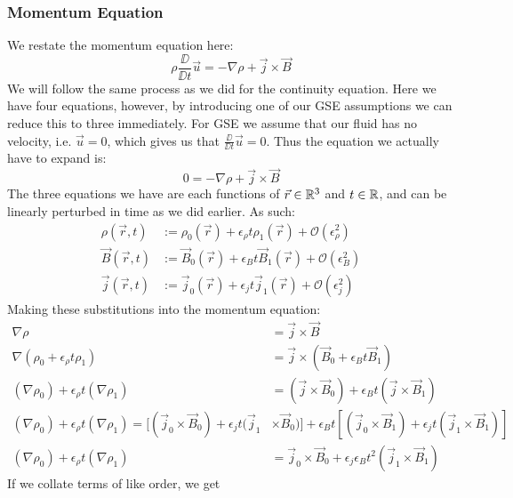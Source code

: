 \subsubsection{Momentum Equation}
We restate the momentum equation here:
\begin{equation*}
    \rho \frac{\DD}{\DD t}\vec{u} = -\nabla \rho + \vec{j} \times \vec{B}
\end{equation*}
We will follow the same process as we did for the continuity equation. Here we have four equations, however, by introducing one of 
our GSE assumptions we can reduce this to three immediately. For GSE we assume that our fluid has no velocity, i.e. $\vec{u} = 0$, which 
gives us that $\frac{\DD}{\DD t} \vec{u} = 0$. Thus the equation we actually have to expand is:
\begin{equation*}
    0 = -\nabla \rho + \vec{j} \times \vec{B}
\end{equation*}
The three equations we have are each functions of $\vec{r} \in \mathbb{R}^3$ and $t \in \mathbb{R}$, and can be linearly perturbed in time as we did earlier. As such:
\begin{align*}
    \rho(\vec{r}, t) &:= \rho_0(\vec{r}) + \epsilon_\rho t \rho_1(\vec{r}) + \mathcal{O}(\epsilon_\rho^2) \\
    \vec{B}(\vec{r}, t) &:= \vec{B}_0(\vec{r}) + \epsilon_B t \vec{B}_1(\vec{r}) + \mathcal{O}(\epsilon_B^2) \\
    \vec{j}(\vec{r}, t) &:= \vec{j}_0(\vec{r}) + \epsilon_j t \vec{j}_1(\vec{r}) + \mathcal{O}(\epsilon_j^2)
\end{align*}
Making these substitutions into the momentum equation:
\begin{align*}
    \nabla \rho &= \vec{j} \times \vec{B} \\
    \nabla (\rho_0 + \epsilon_\rho t \rho_1) &= \vec{j} \times (\vec{B}_0 + \epsilon_B t \vec{B}_1) \\
    (\nabla \rho_0) + \epsilon_\rho t (\nabla \rho_1) &= (\vec{j} \times \vec{B}_0) + \epsilon_B t (\vec{j} \times \vec{B}_1) \\
    (\nabla \rho_0) + \epsilon_\rho t (\nabla \rho_1) = [(\vec{j}_0 \times \vec{B}_0) + \epsilon_j t (\vec{j}_1 &\times \vec{B}_0)] + \epsilon_B t [(\vec{j}_0 \times \vec{B}_1) + \epsilon_j t (\vec{j}_1 \times \vec{B}_1)] \\
    (\nabla \rho_0) + \epsilon_\rho t (\nabla \rho_1) &= \vec{j}_0 \times \vec{B}_0 + \epsilon_j \epsilon_B t^2 (\vec{j}_1 \times \vec{B}_1)
\end{align*}
If we collate terms of like order, we get 
